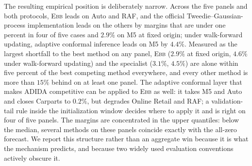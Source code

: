 \documentclass[twoside]{article}
\theoremstyle{definition}
\newcommand{\EBB}{\textsc{Ebb}}
\begin{document}
The resulting empirical position is deliberately narrow. %
Across the five
panels and both protocols, \EBB{} leads on Auto and RAF, and the official
Tweedie--Gaussian-process implementation leads on the others by margins
that are under one percent in four of five cases and $2.9\%$ on M5 at
fixed origin; under walk-forward updating, adaptive conformal inference
leads on M5 by $4.4\%$. Measured as the largest shortfall to the best
method on any panel, \EBB{} ($2.9\%$ at fixed origin, $4.6\%$ under
walk-forward updating) and the specialist ($3.1\%$, $4.5\%$) are alone
within five percent of the best competing method everywhere, and every
other method is more than $15\%$ behind on at least one panel. The
adaptive conformal layer that makes ADIDA competitive can be applied to
\EBB{} as well: it takes M5 and Auto and closes Carparts to $0.2\%$, but
degrades Online Retail and RAF; a validation-tail rule inside the
initialization window decides where to apply it and is right on four of
five panels. The margins are concentrated in the
upper quantiles: below the median, several methods on these panels
coincide exactly with the all-zero forecast. We report this structure rather than an aggregate
win because it is what the mechanism predicts, and because two widely used
evaluation conventions actively obscure it.
\end{document}
